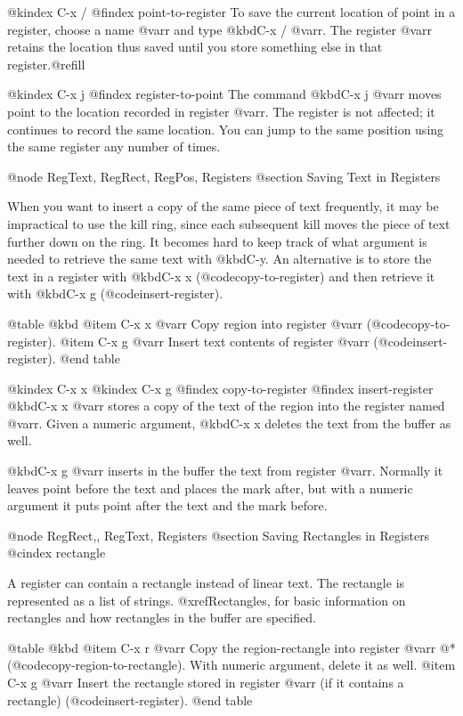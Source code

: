 {{{{{{{{@kindex C-x /
@findex point-to-register
  To save the current location of point in a register, choose a name
@var{r} and type @kbd{C-x / @var{r}}.  The register @var{r} retains
the location thus saved until you store something else in that
register.@refill

@kindex C-x j
@findex register-to-point
  The command @kbd{C-x j @var{r}} moves point to the location recorded
in register @var{r}.  The register is not affected; it continues to
record the same location.  You can jump to the same position using the
same register any number of times.

@node RegText, RegRect, RegPos, Registers
@section Saving Text in Registers

  When you want to insert a copy of the same piece of text frequently, it
may be impractical to use the kill ring, since each subsequent kill moves
the piece of text further down on the ring.  It becomes hard to keep track
of what argument is needed to retrieve the same text with @kbd{C-y}.  An
alternative is to store the text in a register with @kbd{C-x x}
(@code{copy-to-register}) and then retrieve it with @kbd{C-x g}
(@code{insert-register}).

@table @kbd
@item C-x x @var{r}
Copy region into register @var{r} (@code{copy-to-register}).
@item C-x g @var{r}
Insert text contents of register @var{r} (@code{insert-register}).
@end table

@kindex C-x x
@kindex C-x g
@findex copy-to-register
@findex insert-register
  @kbd{C-x x @var{r}} stores a copy of the text of the region into the
register named @var{r}.  Given a numeric argument, @kbd{C-x x} deletes the
text from the buffer as well.

  @kbd{C-x g @var{r}} inserts in the buffer the text from register @var{r}.
Normally it leaves point before the text and places the mark after, but
with a numeric argument it puts point after the text and the mark before.

@node RegRect,, RegText, Registers
@section Saving Rectangles in Registers
@cindex rectangle

  A register can contain a rectangle instead of linear text.  The rectangle
is represented as a list of strings.  @xref{Rectangles}, for basic
information on rectangles and how rectangles in the buffer are specified.

@table @kbd
@item C-x r @var{r}
Copy the region-rectangle into register @var{r} @*(@code{copy-region-to-rectangle}).
With numeric argument, delete it as well.
@item C-x g @var{r}
Insert the rectangle stored in register @var{r} (if it contains a
rectangle) (@code{insert-register}).
@end table

}}}}}}}}
